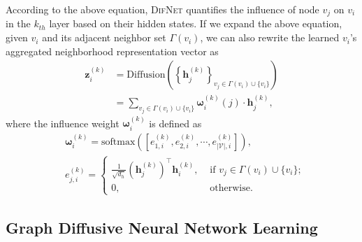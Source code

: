 \documentclass{article}
\newcommand{\mb}{\mathbf}
\newcommand{\bs}{\boldsymbol}
\newcommand{\mc}{\mathcal}
\newcommand{\our}{\textsc{DifNet}}
\begin{document}
According to the above equation, {\our} quantifies the influence of node $v_j$ on $v_i$ in the $k_{th}$ layer based on their hidden states. If we expand the above equation, given $v_i$ and its adjacent neighbor set $\Gamma(v_i)$, we can also rewrite the learned $v_i$'s aggregated neighborhood representation vector as
\begin{equation}
\begin{aligned}
\mb{z}_i^{(k)} &= \mbox{Diffusion}\left( \left\{ \mb{h}_j^{(k)} \right \}_{v_j \in \Gamma(v_i) \cup \{v_i\} } \right)\\
&= \sum_{v_j \in \Gamma(v_i) \cup \{v_i\}} \bs{\omega}^{(k)}_{i}(j) \cdot \mb{h}_j^{(k)},
\end{aligned}
\end{equation}
where the influence weight $\bs{\omega}^{(k)}_i$ is defined as
\begin{equation}
\begin{aligned}
&\bs{\omega}^{(k)}_i = \mbox{softmax} \left( \left[e^{(k)}_{1,i}, e^{(k)}_{2,i}, \cdots, e^{(k)}_{|\mc{V}|,i} \right] \right),\\
&e^{(k)}_{j,i} = \begin{cases}
\frac{1}{\sqrt{d_h}} (\mb{h}_j^{(k)})^\top \mb{h}_i^{(k)}, & \mbox{ if } v_j \in \Gamma(v_i) \cup \{v_i\}; \\
0, & \mbox{ otherwise}.
\end{cases}
\end{aligned}
\end{equation}




\subsection{Graph Diffusive Neural Network Learning}
\end{document}
